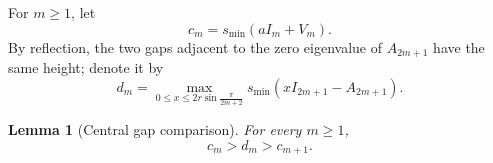\documentclass[a4paper,preprint,12pt,nopreprintline,sort&compress]{elsarticle}
\numberwithin{equation}{section}
\newtheorem{lemma}[theorem]{Lemma}
\theoremstyle{remark}
\begin{document}
For \(m\geq1\), let
\begin{equation}\label{eq:c-height-def}
 c_m=s_{\min}(aI_m+V_m).
\end{equation}
By reflection, the two gaps adjacent to the zero eigenvalue of
\(A_{2m+1}\) have the same height; denote it by
\begin{equation}\label{eq:d-height-def}
 d_m=\max_{0\leq x\leq2r\sin\frac{\pi}{2m+2}}
 s_{\min}(xI_{2m+1}-A_{2m+1}).
\end{equation}

\begin{lemma}[Central gap comparison]\label{lem:central-gap-comparison}
For every \(m\geq1\),
\begin{equation}\label{eq:central-interlace}
 c_m>d_m>c_{m+1}.
\end{equation}
\end{lemma}
\end{document}
